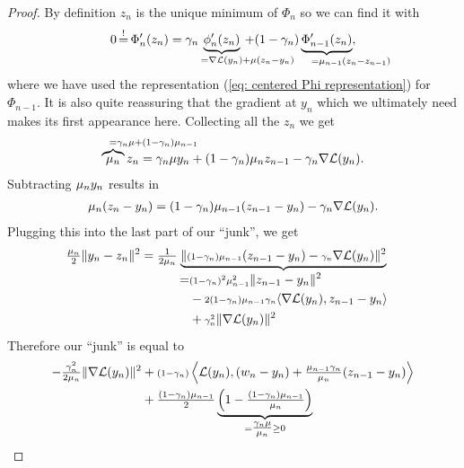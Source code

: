 \begin{proof}
	By definition \(z_n\) is the unique minimum of \(\Phi_n\) so we can find
	it with
	\begin{align*}
		0\xeq{!}\Phi'_n(z_n)
		= \gamma_n\underbrace{\phi_n'(z_n)}_{
			= \nabla\Loss(y_n) \mathrlap{+ \lbound(z_n-y_n)}
		} +(1-\gamma_n)
		\underbrace{\Phi'_{n-1}(z_n)}_{
			=\lbound_{n-1}\mathrlap{(z_n-z_{n-1})}
		},
	\end{align*}
	where we have used the representation (\ref{eq: centered Phi representation})
	for \(\Phi_{n-1}\). It is also quite reassuring that the gradient at \(y_n\)
	which we ultimately need makes its first appearance here. Collecting all
	the \(z_n\) we get
	\begin{align}\label{eq: center of Phi recursion}
		\overbrace{\lbound_n}^{
			=\mathrlap{\gamma_n\lbound + (1-\gamma_n)\lbound_{n-1}}
		}z_n
		= \gamma_n\lbound y_n + (1-\gamma_n)\lbound_n z_{n-1}
		- \gamma_n\nabla\Loss(y_n).
	\end{align}
	Subtracting \(\mu_n y_n\) results in
	\begin{align*}
		\mu_n(z_n-y_n)
		= (1-\gamma_n)\mu_{n-1}(z_{n-1}-y_n)
		- \gamma_n\nabla\mathcal{L}(y_n).
	\end{align*}
	Plugging this into the last part of our ``junk'', we get
	\begin{align*}
		\tfrac{\mu_n}2\|y_n-z_n\|^2
		&= \tfrac1{2\mu_n}
		\underbrace{
			\|{\scriptstyle (1-\gamma_n)\mu_{n-1}}(z_{n-1}-y_n)
			- {\scriptstyle \gamma_n}\nabla\mathcal{L}(y_n)\|^2
		}_{
		\begin{aligned}
			=&{\scriptstyle (1-\gamma_n)^2\mu_{n-1}^2}\|z_{n-1}-y_n\|^2 \\
			&- {\scriptstyle 2(1-\gamma_n)\mu_{n-1}\gamma_n}\langle
			\nabla\mathcal{L}(y_n), z_{n-1}-y_n\rangle \\
			&+ {\scriptstyle\gamma_n^2}\|\nabla\mathcal{L}(y_n)\|^2
		\end{aligned}
		}
	\end{align*}
	Therefore our ``junk'' is equal to
	\begin{align*}
		-\tfrac{\gamma_n^2}{2\mu_n}\|\nabla\mathcal{L}(y_n)\|^2
		\begin{aligned}[t]
			&+ {\scriptstyle(1-\gamma_n)}\left\langle \mathcal{L}(y_n),
			(w_n -y_n)
			+ \tfrac{\mu_{n-1}\gamma_n}{\mu_n}(z_{n-1} - y_n)
			\right\rangle\\
			&+\tfrac{(1-\gamma_n)\mu_{n-1}}{2}
			\underbrace{\left(1-\tfrac{(1-\gamma_n)\mu_{n-1}}{\mu_n}\right)}_{
				= \tfrac{\gamma_n \mu}{\mu_n} \ge 0
}
\end{aligned}
\end{align*}
\end{proof}
